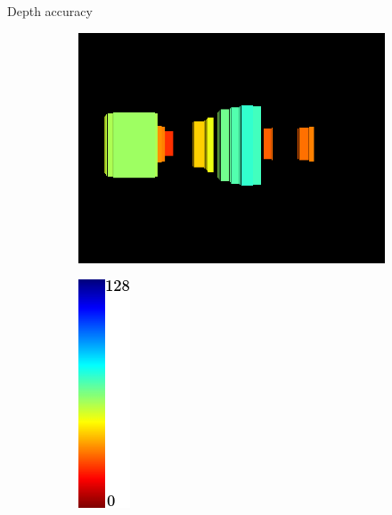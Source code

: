 \begin{frame}[plain]{Depth accuracy}
\begin{center}
\begin{figure}
\begin{subfigure}[b]{0.3\textwidth}
	  \end{subfigure}%
	  \begin{subfigure}[b]{0.3\textwidth}
	      \includegraphics[height=0.3\figuresheight]{objects}
	  \end{subfigure}%
	  \begin{subfigure}[b]{0.1\textwidth}
	      \includegraphics[height=0.3\figuresheight]{colorscale_jet}
	  \end{subfigure}%
    \end{figure}
  \end{center}
\end{frame}

